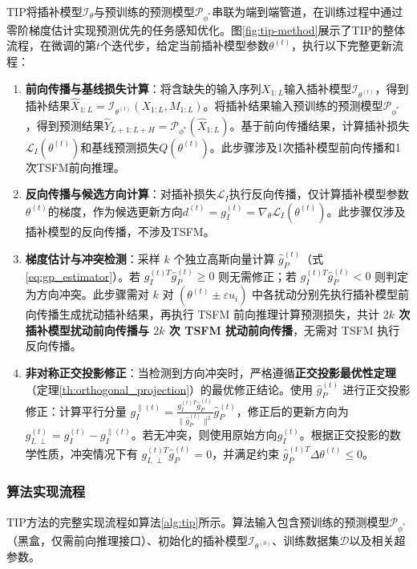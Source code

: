\documentclass{article}
\begin{document}
TIP将插补模型$\mathcal{I}_{\theta}$与预训练的预测模型$\mathcal{P}_{\phi^\ast}$串联为端到端管道，在训练过程中通过零阶梯度估计实现预测优先的任务感知优化。图\ref{fig:tip-method}展示了TIP的整体流程，在微调的第$t$个迭代步，给定当前插补模型参数$\theta^{(t)}$，执行以下完整更新流程：
\begin{enumerate}
	\item\textbf{前向传播与基线损失计算}：将含缺失的输入序列$X_{1:L}$输入插补模型$\mathcal{I}_{\theta^{(t)}}$，得到插补结果$\hat{X}_{1:L} =\mathcal{I}_{\theta^{(t)}}(X_{1:L}, M_{1:L})$。将插补结果输入预训练的预测模型$\mathcal{P}_{\phi^\ast}$，得到预测结果$\hat{Y}_{L+1:L+H} =\mathcal{P}_{\phi^\ast}(\hat{X}_{1:L})$。基于前向传播结果，计算插补损失$\mathcal{L}_I(\theta^{(t)})$和基线预测损失$Q(\theta^{(t)})$。此步骤涉及1次插补模型前向传播和1次TSFM前向推理。
	\item\textbf{反向传播与候选方向计算}：对插补损失$\mathcal{L}_I$执行反向传播，仅计算插补模型参数$\theta^{(t)}$的梯度，作为候选更新方向$d^{(t)} = g_I^{(t)} = \nabla_\theta\mathcal{L}_I(\theta^{(t)})$。此步骤仅涉及插补模型的反向传播，不涉及TSFM。
	\item\textbf{梯度估计与冲突检测}：采样 $k$ 个独立高斯向量计算 $\hat{g}_P^{(t)}$（式\ref{eq:gp_estimator}）。若 $g_I^{(t)T} \hat{g}_P^{(t)} \geq 0$ 则无需修正；若 $g_I^{(t)T} \hat{g}_P^{(t)} < 0$ 则判定为方向冲突。此步骤需对 $k$ 对 $(\theta^{(t)}\pm\varepsilon u_i)$ 中各扰动分别先执行插补模型前向传播生成扰动插补结果，再执行 TSFM 前向推理计算预测损失，共计\textbf{ $2k$ 次插补模型扰动前向传播与 $2k$ 次 TSFM 扰动前向传播}，无需对 TSFM 执行反向传播。
	\item\textbf{非对称正交投影修正}：当检测到方向冲突时，严格遵循\textbf{正交投影最优性定理}（定理\ref{th:orthogonal_projection}）的最优修正结论。使用 $\hat{g}_P^{(t)}$ 进行正交投影修正：计算平行分量 $g_I^{\parallel (t)} =\frac{g_I^{(t)T} \hat{g}_P^{(t)}}{\|\hat{g}_P^{(t)}\|^2} \hat{g}_P^{(t)}$，修正后的更新方向为 $g_{I,\perp}^{(t)} = g_I^{(t)} - g_I^{\parallel (t)}$。若无冲突，则使用原始方向$g_I^{(t)}$。根据正交投影的数学性质，冲突情况下有 $g_{I,\perp}^{(t)T} \hat{g}_P^{(t)} = 0$，并满足约束 $\hat{g}_P^{(t)T}\Delta\theta^{(t)} \leq 0$。
\end{enumerate}

\subsubsection{算法实现流程}

TIP方法的完整实现流程如算法\ref{alg:tip}所示。算法输入包含预训练的预测模型$\mathcal{P}_{\phi^\ast}$（黑盒，仅需前向推理接口）、初始化的插补模型$\mathcal{I}_{\theta^{(0)}}$、训练数据集$\mathcal{D}$以及相关超参数。
\end{document}
